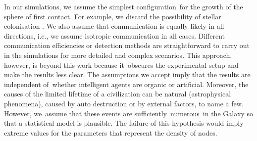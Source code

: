 \documentclass[crop]{CSLB}
\begin{document}
In our simulations, we assume the simplest configuration for the
growth of the sphere of first contact. For example, we discard the
possibility of stellar colonisation
\citep[e.g.][]{newman_galactic_1981, walters_interstellar_1980,
starling_virulence_2013, barlow_galactic_2012, jeong_large_2000,
maccone_mathematical_2011}. We also assume that communication is
equally likely in all directions, i.e., we assume isotropic
communication in all cases. Different communication efficiencies or
detection methods are straightforward to carry out in the simulations
for more detailed and complex scenarios. This approach, however, is
beyond this work because it obscures the experimental setup and make
the results less clear. The assumptions we accept imply that the
results are independent of whether intelligent agents are organic or
artificial. Moreover, the causes of the limited lifetime of a
civilization can be natural (astrophysical phenomena), caused by auto
destruction or by external factors, to name a few. However, we assume
that these events are sufficiently numerous in the Galaxy so that a
statistical model is plausible. The failure of this hypothesis would
imply extreme values for the parameters that represent the density of
nodes.






\end{document}
